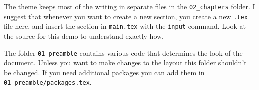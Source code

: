 The theme keeps most of the writing in separate files in the \texttt{02\_chapters} folder. I suggest that whenever you want to create a new section, you create a new \texttt{.tex} file here, and insert the section in \texttt{main.tex} with the \texttt{input} command. Look at the source for this demo to understand exactly how. 

The folder \texttt{01\_preamble} contains various code that determines the look of the document. Unless you want to make changes to the layout this folder shouldn't be changed. If you need additional packages you can add them in \texttt{01\_preamble/packages.tex}.